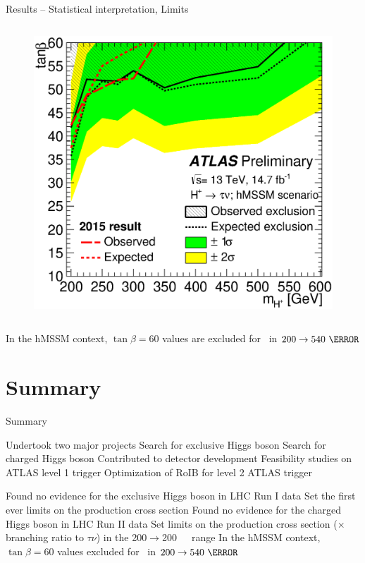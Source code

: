 \documentclass[10pt]{beamer}
\begin{document}
\begin{frame}{Results -- Statistical interpretation, Limits}
\begin{columns}
\begin{column}{0.5\linewidth}
\begin{figure}
					 \includegraphics[width=\textwidth]{figures/exclusion_run2016taunu_v2_hmssm_taunu.eps}
\end{figure}
	\end{column}
\end{columns}
\centering
{\large\color{blue} In the hMSSM context, $\tan\beta=60$ values are excluded for \mcH\ in $200\to 540~\GeV$}
\end{frame}

\section{Summary}

\begin{frame}{Summary}
\begin{outline}
\1 Undertook two major projects
	\2 Search for exclusive Higgs boson
	\2 Search for charged Higgs boson
\1 Contributed to detector development
	\2 Feasibility studies on ATLAS level 1 trigger
	\2 Optimization of RoIB for level 2 ATLAS trigger
\end{outline}
\noindent\makebox[\linewidth]{\rule{\paperwidth}{0.4pt}}

\begin{outline}
\1 Found no evidence for the exclusive Higgs boson in LHC Run I data
	\2 Set the first ever limits on the production cross section
\1 Found no evidence for the charged Higgs boson in LHC Run II data
	\2 Set limits on the production cross section ($\times$ branching ratio to $\tau\nu$) 
in the 200$\to$200~\GeV\ \mcH\ range
	\2 In the hMSSM context, $\tan\beta=60$ values excluded for \mcH\ in $200\to 540~\GeV$
\end{outline}
\end{frame}
\end{document}
